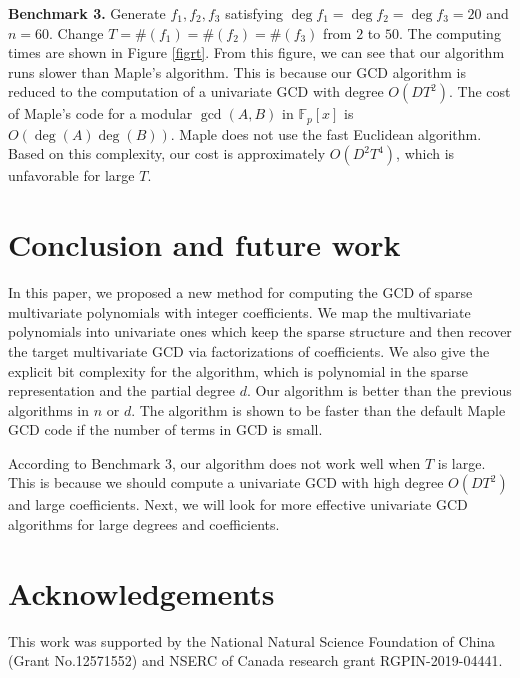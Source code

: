 \documentclass[final,20pt]{elsarticle}
\def\F{{\mathbb{F}}}
\begin{document}
{\bf Benchmark 3.}
Generate $f_1,f_2,f_3$ satisfying  $\deg f_1=\deg f_2=\deg f_3=20$ and $n=60$. Change $T=\#(f_1)=\#(f_2)=\#(f_3)$ from $2$ to $50$.
%
The computing times are shown in Figure \ref{figrt}.
From this figure, we can see that our algorithm runs slower than Maple's algorithm. This is because our GCD algorithm is reduced to the computation of a univariate GCD with degree $O(D T^2)$.  %
The cost of Maple's code for a modular $\gcd(A,B)$ in $\F_p[x]$ is $O(\deg(A) \deg(B))$. Maple does not use the fast Euclidean algorithm. Based on this complexity, our cost is approximately $O(D^2T^4)$, which is unfavorable for large $T$.
%



\section{Conclusion and future work}
In this paper, we proposed a new method for computing the GCD of sparse multivariate polynomials  with integer coefficients. %
We map the multivariate polynomials into univariate ones which keep the sparse structure and then recover the target multivariate GCD via factorizations of coefficients.
%
We also give the explicit bit complexity for the algorithm, which is polynomial in the sparse representation and the partial degree $d$. Our algorithm is better than the previous algorithms in $n$ or $d$.
%
The algorithm is shown to be faster than the default Maple GCD code if the number of terms in GCD is small.

According to Benchmark 3, our algorithm does not work well when $T$ is large. This is because we should compute a univariate GCD with high degree $O(DT^2)$ and large coefficients. Next, we will look for more effective univariate GCD algorithms for large degrees and coefficients.

\section*{Acknowledgements}
This work was supported by the National Natural Science Foundation of China (Grant No.12571552) and
 NSERC of Canada research grant RGPIN-2019-04441.


\end{document}
